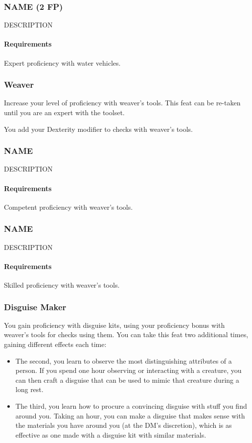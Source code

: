 \subsubsection{NAME (2 FP)} \label{feat::name}
    DESCRIPTION
    \paragraph{Requirements} Expert proficiency with water vehicles.

\subsubsection{Weaver} \label{feat::weaver}
    Increase your level of proficiency with weaver's tools.
    This feat can be re-taken until you are an expert with the toolset.

    You add your Dexterity modifier to checks with weaver's tools.
\subsubsection{NAME} \label{feat::name}
    DESCRIPTION
    \paragraph{Requirements} Competent proficiency with weaver's tools.
\subsubsection{NAME} \label{feat::name}
    DESCRIPTION
    \paragraph{Requirements} Skilled proficiency with weaver's tools.
\subsubsection{Disguise Maker} \label{feat::disguisemaker}
    You gain proficiency with disguise kits, using your proficiency bonus with weaver's tools for checks using them.
    You can take this feat two additional times, gaining different effects each time:
    \begin{itemize}
        \item The second, you learn to observe the most distinguishing attributes of a person.
        If you spend one hour observing or interacting with a creature, you can then craft a disguise that can be used to mimic that creature during a long rest.
        \item The third, you learn how to procure a convincing disguise with stuff you find around you.
        Taking an hour, you can make a disguise that makes sense with the materials you have around you (at the DM's discretion), which is as effective as one made with a disguise kit with similar materials.
    \end{itemize}
